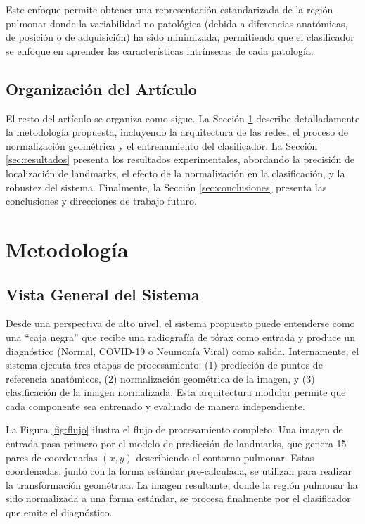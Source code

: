 \documentclass[runningheads]{llncs}
\begin{document}
Este enfoque permite obtener una representación estandarizada de la región pulmonar donde la variabilidad no patológica (debida a diferencias anatómicas, de posición o de adquisición) ha sido minimizada, permitiendo que el clasificador se enfoque en aprender las características intrínsecas de cada patología.

\subsection{Organización del Artículo}

El resto del artículo se organiza como sigue. La Sección \ref{sec:metodologia} describe detalladamente la metodología propuesta, incluyendo la arquitectura de las redes, el proceso de normalización geométrica y el entrenamiento del clasificador. La Sección \ref{sec:resultados} presenta los resultados experimentales, abordando la precisión de localización de landmarks, el efecto de la normalización en la clasificación, y la robustez del sistema. Finalmente, la Sección \ref{sec:conclusiones} presenta las conclusiones y direcciones de trabajo futuro.

\section{Metodología}
\label{sec:metodologia}

\subsection{Vista General del Sistema}

Desde una perspectiva de alto nivel, el sistema propuesto puede entenderse como una ``caja negra'' que recibe una radiografía de tórax como entrada y produce un diagnóstico (Normal, COVID-19 o Neumonía Viral) como salida. Internamente, el sistema ejecuta tres etapas de procesamiento: (1) predicción de puntos de referencia anatómicos, (2) normalización geométrica de la imagen, y (3) clasificación de la imagen normalizada. Esta arquitectura modular permite que cada componente sea entrenado y evaluado de manera independiente.

La Figura \ref{fig:flujo} ilustra el flujo de procesamiento completo. Una imagen de entrada pasa primero por el modelo de predicción de landmarks, que genera 15 pares de coordenadas $(x,y)$ describiendo el contorno pulmonar. Estas coordenadas, junto con la forma estándar pre-calculada, se utilizan para realizar la transformación geométrica. La imagen resultante, donde la región pulmonar ha sido normalizada a una forma estándar, se procesa finalmente por el clasificador que emite el diagnóstico.
\end{document}
